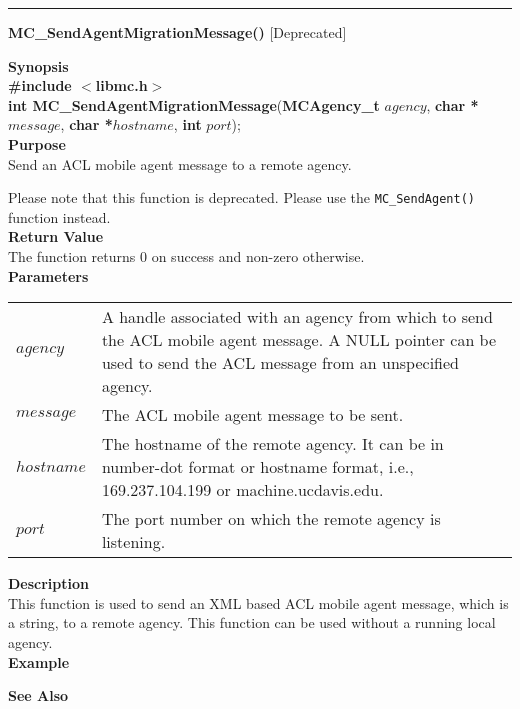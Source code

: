 \noindent
\vspace{5pt}
\rule{6.5in}{.01in}
\noindent
{\LARGE \bf MC\_SendAgentMigrationMessage()} [Deprecated] \\
{}

\noindent
{\bf Synopsis}\\
{\bf \#include $<$libmc.h$>$}\\
{\bf int MC\_SendAgentMigrationMessage}({\bf MCAgency\_t} $agency$, {\bf char *}$message$, {\bf char *}$hostname$, {\bf int} $port$);\\

\noindent
{\bf Purpose}\\
Send an ACL mobile agent message to a remote agency.

Please note that this function is deprecated. Please use the
\texttt{MC\_SendAgent()} function instead.\\

\noindent
{\bf Return Value}\\
The function returns 0 on success and non-zero otherwise.\\

\noindent
{\bf Parameters}
\vspace{-0.1in}
\begin{description}
\item
\begin{tabular}{p{20 mm}p{135 mm}}
$agency$ & A handle associated with an agency from which to send the ACL 
mobile agent message. A NULL pointer can be used to send the ACL message 
from an unspecified agency.\\ 
$message$ & The ACL mobile agent message to be sent.\\
$hostname$ & The hostname of the remote agency. It can be in number-dot 
format or hostname format, i.e., 169.237.104.199 or machine.ucdavis.edu.\\
$port$ & The port number on which the remote agency is listening. 
\end{tabular}
\end{description}

\noindent
{\bf Description}\\
This function is used to send an XML based ACL mobile agent message, which 
is a string, to a remote agency. 
This function can be used without a running local agency.\\

\noindent
{\bf Example}\\
\noindent

\noindent
{\bf See Also}\\

